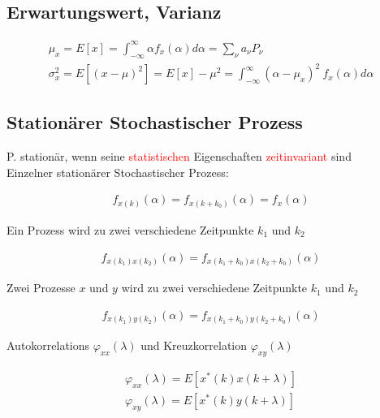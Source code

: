 \documentclass[10pt,a4paper]{article}
\begin{document}
\subsection{Erwartungswert, Varianz}
  \begin{mdframed}[style=exercise]
    \begin{align}
        \mu_x = E[x] = \displaystyle\int_{-\infty}^{\infty} \alpha f_x(\alpha) d\alpha = \displaystyle\sum_{\nu}^{} a_\nu P_\nu\\
        \sigma_x^2 = E[(x-\mu)^2] = E[x]-\mu^2  = \displaystyle\int_{-\infty}^{\infty} (\alpha-\mu_x)^2 \ f_x(\alpha) d\alpha
    \end{align}
  \end{mdframed}
\subsection{Stationärer Stochastischer Prozess}
P. stationär, wenn seine \textcolor{red}{statistischen} Eigenschaften \textcolor{red}{zeitinvariant} sind \\
Einzelner stationärer Stochastischer Prozess:
  \begin{mdframed}[style=exercise]
    \begin{align}
        f_{x(k)}(\alpha) = f_{x(k+k_0)}(\alpha) = f_x(\alpha)
    \end{align}
  \end{mdframed}
Ein Prozess wird zu zwei verschiedene Zeitpunkte $k_1$ und $k_2$
  \begin{mdframed}[style=exercise]
    \begin{align}
        f_{x(k_1)x(k_2)}(\alpha) = f_{x(k_1+k_0)x(k_2+k_0)}(\alpha)
    \end{align}
  \end{mdframed}
Zwei Prozesse $x$ und $y$ wird zu zwei verschiedene Zeitpunkte $k_1$ und $k_2$
\begin{mdframed}[style=exercise]
    \begin{align}
        f_{x(k_1)y(k_2)}(\alpha) = f_{x(k_1+k_0)y(k_2+k_0)}(\alpha)
    \end{align}
  \end{mdframed}
Autokorrelations $\varphi_{xx}(\lambda)$ und Kreuzkorrelation $\varphi_{xy}(\lambda)$
\begin{mdframed}[style=exercise]
    \begin{align}
        \varphi_{xx}(\lambda) = E[x^*(k)x(k+\lambda)] \\
        \varphi_{xy}(\lambda) =E[x^*(k)y(k+\lambda)]
    \end{align}
  \end{mdframed}
\end{document}
